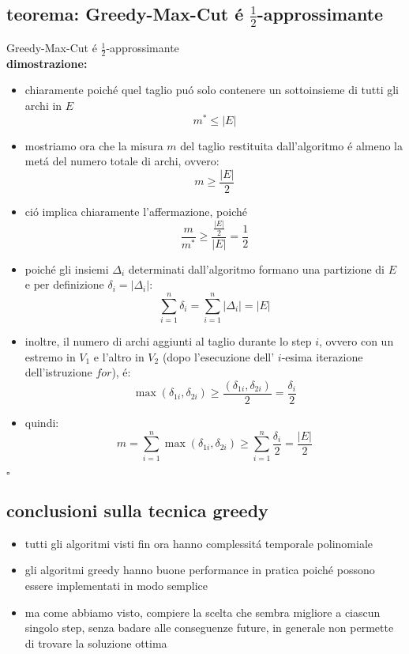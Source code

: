 \subsection*{teorema: Greedy-Max-Cut \'e $\frac{1}{2}$-approssimante}
\begin{flushleft}
	Greedy-Max-Cut \'e $\frac{1}{2}$-approssimante \newline \\
	\vspace{0.5cm}
	\textbf{dimostrazione:}
	\begin{itemize}
		\item chiaramente poich\'e quel taglio pu\'o solo contenere un sottoinsieme di tutti gli archi in $E$
			$$m^*\leq\vert E\vert$$
		\item mostriamo ora che la misura $m$ del taglio restituita dall'algoritmo \'e almeno la met\'a del numero totale di archi, ovvero:
			$$m\geq\frac{\vert E\vert}{2}$$
		\item ci\'o implica chiaramente l'affermazione, poich\'e
			$$\frac{m}{m^*}\geq\frac{\frac{\vert E\vert}{2}}{\vert E\vert}=\frac{1}{2}$$
		\item poich\'e gli insiemi $\Delta_i$ determinati dall'algoritmo formano una partizione di $E$ e per definizione $\delta_i=\vert\Delta_i\vert$:
			$$\sum_{i=1}^n\delta_i=\sum_{i=1}^n\vert\Delta_i\vert=\vert E\vert$$
		\item inoltre, il numero di archi aggiunti al taglio durante lo step $i$, ovvero con un estremo in $V_1$ e l'altro in $V_2$ (dopo l'esecuzione dell' $i$-esima iterazione dell'istruzione $for$), \'e:
			$$\max(\delta_{1i},\delta_{2i})\geq\frac{(\delta_{1i},\delta_{2i})}{2}=\frac{\delta_i}{2}$$
		\item quindi:
			$$m=\sum_{i=1}^n\max(\delta_{1i},\delta_{2i})\geq\sum_{i=1}^n\frac{\delta_i}{2}=\frac{\vert E\vert}{2}$$
	\end{itemize}
	\hfill$\square$
\end{flushleft}


\subsection*{conclusioni sulla tecnica greedy}
\begin{flushleft}
	\begin{itemize}
		\item tutti gli algoritmi visti fin ora hanno complessit\'a temporale polinomiale
		\item gli algoritmi greedy hanno buone performance in pratica poich\'e possono essere implementati in modo semplice
		\item ma come abbiamo visto, compiere la scelta che sembra migliore a ciascun singolo step, senza badare alle conseguenze future, in generale non permette di trovare la soluzione ottima
	\end{itemize}
\end{flushleft}


\newpage
